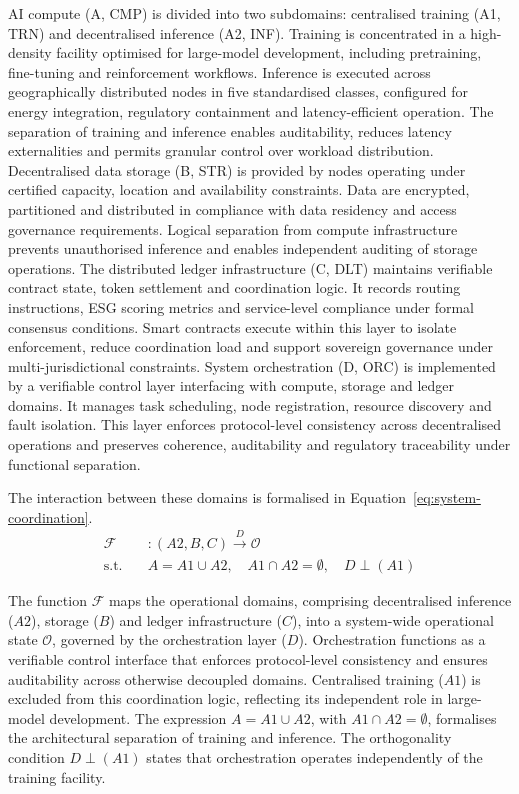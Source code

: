 \documentclass[oneside,10pt]{swissi}
\begin{document}
AI compute (A, CMP) is divided into two subdomains: centralised training (A1, TRN) and decentralised inference (A2, INF). Training is concentrated in a high-density facility optimised for large-model development, including pretraining, fine-tuning and reinforcement workflows. Inference is executed across geographically distributed nodes in five standardised classes, configured for energy integration, regulatory containment and latency-efficient operation. The separation of training and inference enables auditability, reduces latency externalities and permits granular control over workload distribution. Decentralised data storage (B, STR) is provided by nodes operating under certified capacity, location and availability constraints. Data are encrypted, partitioned and distributed in compliance with data residency and access governance requirements. Logical separation from compute infrastructure prevents unauthorised inference and enables independent auditing of storage operations. The distributed ledger infrastructure (C, DLT) maintains verifiable contract state, token settlement and coordination logic. It records routing instructions, ESG scoring metrics and service-level compliance under formal consensus conditions. Smart contracts execute within this layer to isolate enforcement, reduce coordination load and support sovereign governance under multi-jurisdictional constraints. System orchestration (D, ORC) is implemented by a verifiable control layer interfacing with compute, storage and ledger domains. It manages task scheduling, node registration, resource discovery and fault isolation. This layer enforces protocol-level consistency across decentralised operations and preserves coherence, auditability and regulatory traceability under functional separation.

The interaction between these domains is formalised in Equation~\eqref{eq:system-coordination}.
\begin{align}
\label{eq:system-coordination}
\mathcal{F} &: (A2, B, C) \xrightarrow{D} \mathcal{O} \\
\text{s.t.} \quad & A = A1 \cup A2,\quad A1 \cap A2 = \emptyset,\quad D \perp (A1) \nonumber
\end{align}

The function \( \mathcal{F} \) maps the operational domains, comprising decentralised inference (\( A2 \)), storage (\( B \)) and ledger infrastructure (\( C \)), into a system-wide operational state \( \mathcal{O} \), governed by the orchestration layer (\( D \)). Orchestration functions as a verifiable control interface that enforces protocol-level consistency and ensures auditability across otherwise decoupled domains. Centralised training (\( A1 \)) is excluded from this coordination logic, reflecting its independent role in large-model development. The expression \( A = A1 \cup A2 \), with \( A1 \cap A2 = \emptyset \), formalises the architectural separation of training and inference. The orthogonality condition \( D \perp (A1) \) states that orchestration operates independently of the training facility.\\
\end{document}
